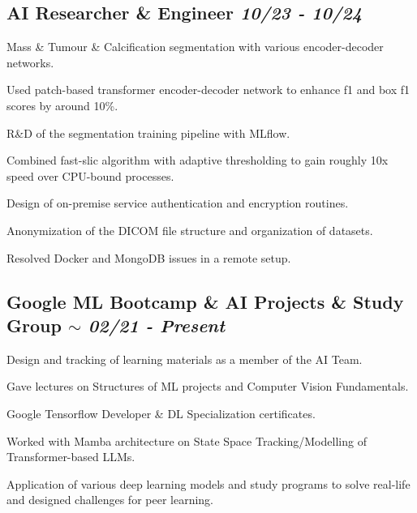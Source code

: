\documentclass[letter, 14pt]{article}
\begin{document}
\subsection{AI Researcher \& Engineer \hfill \textit{\textmd{10/23 - 10/24}}}
\begin{zitemize}
\item Mass \& Tumour \& Calcification segmentation with various encoder-decoder networks.
\item Used patch-based transformer encoder-decoder network to enhance f1 and box f1 scores by around 10\%.
\item R\&D of the segmentation training pipeline with MLflow.
\item Combined fast-slic algorithm with adaptive thresholding to gain roughly 10x speed over CPU-bound processes.
\item Design of on-premise service authentication and encryption routines.
\item Anonymization of the DICOM file structure and organization of datasets.
\item Resolved Docker and MongoDB issues in a remote setup. 
\end{zitemize}

\subsection{Google ML Bootcamp \& AI Projects \& Study Group \hfill\textit{\textmd{{\tiny$\sim$} 02/21 - Present}}}
\begin{zitemize}
\item Design and tracking of learning materials as a member of the AI Team.
\item Gave lectures on Structures of ML projects and Computer Vision Fundamentals.
\item Google Tensorflow Developer \& DL Specialization certificates.
\item Worked with Mamba architecture on State Space Tracking/Modelling of Transformer-based LLMs.
\item Application of various deep learning models and study programs to solve real-life and designed challenges for peer learning.
\end{zitemize}
\end{document}
